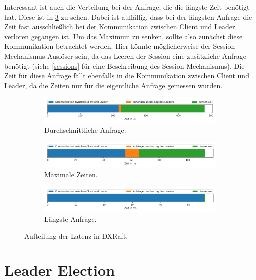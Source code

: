 Interessant ist auch die Verteilung bei der Anfrage, die die längste Zeit benötigt hat. Diese ist in \ref{fig:request-longest} zu sehen. Dabei ist auffällig, dass bei der längsten Anfrage die Zeit fast ausschließlich bei der Kommunikation zwischen Client und Leader verloren gegangen ist. Um das Maximum zu senken, sollte also zunächst diese Kommunikation betrachtet werden. Hier könnte möglicherweise der Session-Mechanismus Auslöser sein, da das Leeren der Session eine zusätzliche Anfrage benötigt (siehe \ref{sessions} für eine Beschreibung des Session-Mechanismus). Die Zeit für diese Anfrage fällt ebenfalls in die Kommunikation zwischen Client und Leader, da die Zeiten nur für die eigentliche Anfrage gemessen wurden.

\begin{figure}[t]
	\centering
	\begin{subfigure}[t]{1\textwidth}
		\includegraphics[width=\textwidth]{img/request_avg_timing.png}
		\caption{Durchschnittliche Anfrage.}
		\label{fig:request-avg}
	\end{subfigure}
	\begin{subfigure}[t]{1\textwidth}
		\includegraphics[width=\textwidth]{img/request_max_timing.png}
		\caption{Maximale Zeiten.}
		\label{fig:request-max}
	\end{subfigure}
	\begin{subfigure}[t]{1\textwidth}
		\includegraphics[width=\textwidth]{img/request_longest_timing.png}
		\caption{Längste Anfrage.}
		\label{fig:request-longest}
	\end{subfigure}
 	\caption{Aufteilung der Latenz in DXRaft.}
 	\label{fig:latency-analysis}
\end{figure}

\section{Leader Election}

